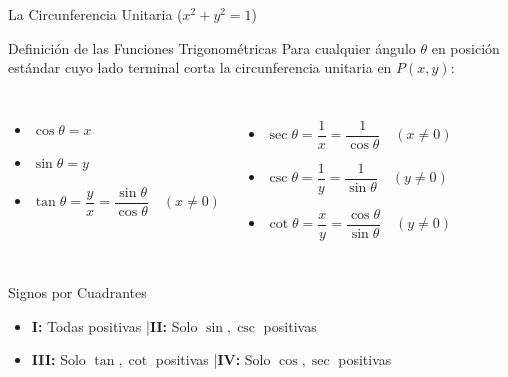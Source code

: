 \documentclass[aspectratio=169]{beamer}
\begin{document}
\begin{frame}{La Circunferencia Unitaria ($x^2 + y^2 = 1$)}
  \begin{block}{Definición de las Funciones Trigonométricas}
    Para cualquier ángulo $\theta$ en posición estándar cuyo lado terminal corta la circunferencia unitaria en $P(x, y)$:
    \begin{columns}[T]
      \begin{itemize}
        \item $\cos\theta = x$
        \item $\sin\theta = y$
        \item $\tan\theta = \dfrac{y}{x} = \dfrac{\sin\theta}{\cos\theta} \quad (x \neq 0)$
      \end{itemize}
      \begin{itemize}
        \item $\sec\theta = \dfrac{1}{x} = \dfrac{1}{\cos\theta} \quad (x \neq 0)$
        \item $\csc\theta = \dfrac{1}{y} = \dfrac{1}{\sin\theta} \quad (y \neq 0)$
        \item $\cot\theta = \dfrac{x}{y} = \dfrac{\cos\theta}{\sin\theta} \quad (y \neq 0)$
      \end{itemize}
    \end{columns}
  \end{block}

  \vspace{4pt}
  \begin{block}{Signos por Cuadrantes}
    \begin{itemize}
      \item \textbf{I:} Todas positivas \quad|\quad \textbf{II:} Solo $\sin, \csc$ positivas
      \item \textbf{III:} Solo $\tan, \cot$ positivas \quad|\quad \textbf{IV:} Solo $\cos, \sec$ positivas
    \end{itemize}
  \end{block}
\end{frame}
\end{document}

